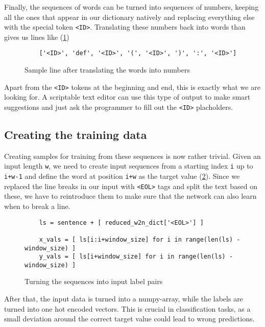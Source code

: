     Finally, the sequences of words can be turned into sequences of numbers, keeping all the ones that appear in
    our dictionary natively and replacing everything else with the special token \verb+<ID>+. Translating
    these numbers back into words than gives us lines like (\ref{fig:goodsample})

    \begin{figure}[htpb]
      \centering
      \begin{verbatim}
    ['<ID>', 'def', '<ID>', '(', '<ID>', ')', ':', '<ID>'] \end{verbatim}
      \caption{Sample line after translating the words into numbers}
      \label{fig:goodsample}
    \end{figure}

    Apart from the \verb+<ID>+ tokens at the beginning and end, this is exactly what we are looking for. A scriptable text editor
    can use this type of output to make smart suggestions and just ask the programmer to fill out the \verb+<ID>+ placholders.

    \subsection{Creating the training data}
    \label{sub:creating_the_training_data}
    
      Creating samples for training from these sequences is now rather trivial. Given an input length \verb+w+, we need
      to create input sequences from a starting index \verb+i+ up to \verb|i+w-1| and define the word at position
      \verb|i+w| as the target value (\ref{fig:tosamples}). Since we replaced the line breaks in our input with
      \verb+<EOL>+ tags and split the text based on these, we have to reintroduce them to make sure that
      the network can also learn when to break a line.

      \begin{figure}[htpb]
        \centering
        \begin{lstlisting}
    ls = sentence + [ reduced_w2n_dict['<EOL>'] ]
    
    x_vals = [ ls[i:i+window_size] for i in range(len(ls) - window_size) ]
    y_vals = [ ls[i+window_size] for i in range(len(ls) - window_size) ] \end{lstlisting}
        \caption{Turning the sequences into input label pairs}
        \label{fig:tosamples}
      \end{figure}

      After that, the input data is turned into a numpy-array, while the labels are turned into one hot encoded vectors.
      This is crucial in classification tasks, as a small deviation around the correct target value could lead to
      wrong predictions.
